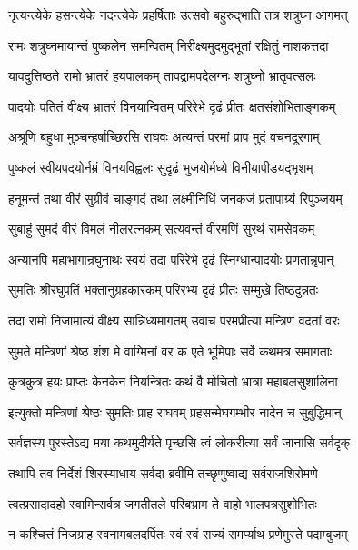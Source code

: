 \twolineshloka
{नृत्यन्त्येके हसन्त्येके नदन्त्येके प्रहर्षिताः}
{उत्सवो बहुरुद्भाति तत्र शत्रुघ्न आगमत्}%

\twolineshloka
{रामः शत्रुघ्नमायान्तं पुष्कलेन समन्वितम्}
{निरीक्ष्यमुदमुद्भूतां रक्षितुं नाशकत्तदा}%

\twolineshloka
{यावदुत्तिष्ठते रामो भ्रातरं हयपालकम्}
{तावद्रामपदेलग्नः शत्रुघ्नो भ्रातृवत्सलः}%

\twolineshloka
{पादयोः पतितं वीक्ष्य भ्रातरं विनयान्वितम्}
{परिरेभे दृढं प्रीतः क्षतसंशोभिताङ्गकम्}%

\twolineshloka
{अश्रूणि बहुधा मुञ्चन्हर्षाच्छिरसि राघवः}
{अत्यन्तं परमां प्राप मुदं वचनदूरगाम्}%

\twolineshloka
{पुष्कलं स्वीयपदयोर्नम्रं विनयविह्वलः}
{सुदृढं भुजयोर्मध्ये विनीयापीडयद्भृशम्}%

\twolineshloka
{हनूमन्तं तथा वीरं सुग्रीवं चाङ्गदं तथा}
{लक्ष्मीनिधिं जनकजं प्रतापाग्र्यं रिपुञ्जयम्}%

\twolineshloka
{सुबाहुं सुमदं वीरं विमलं नीलरत्नकम्}
{सत्यवन्तं वीरमणिं सुरथं रामसेवकम्}%

\twolineshloka
{अन्यानपि महाभागान्रघुनाथः स्वयं तदा}
{परिरेभे दृढं स्निग्धान्पादयोः प्रणतान्नृपान्}%

\twolineshloka
{सुमतिः श्रीरघुपतिं भक्तानुग्रहकारकम्}
{परिरभ्य दृढं प्रीतः सम्मुखे तिष्ठदुन्नतः}%

\twolineshloka
{तदा रामो निजामात्यं वीक्ष्य सान्निध्यमागतम्}
{उवाच परमप्रीत्या मन्त्रिणं वदतां वरः}%

\twolineshloka
{सुमते मन्त्रिणां श्रेष्ठ शंश मे वाग्मिनां वर}
{क एते भूमिपाः सर्वे कथमत्र समागताः}%

\twolineshloka
{कुत्रकुत्र हयः प्राप्तः केनकेन नियन्त्रितः}
{कथं वै मोचितो भ्रात्रा महाबलसुशालिना}%


\twolineshloka
{इत्युक्तो मन्त्रिणां श्रेष्ठः सुमतिः प्राह राघवम्}
{प्रहसन्मेघगम्भीर नादेन च सुबुद्धिमान्}%


\twolineshloka
{सर्वज्ञस्य पुरस्तेऽद्य मया कथमुदीर्यते}
{पृच्छसि त्वं लोकरीत्या सर्वं जानासि सर्वदृक्}%

\twolineshloka
{तथापि तव निर्देशं शिरस्याधाय सर्वदा}
{ब्रवीमि तच्छृणुष्वाद्य सर्वराजशिरोमणे}%

\twolineshloka
{त्वत्प्रसादादहो स्वामिन्सर्वत्र जगतीतले}
{परिबभ्राम ते वाहो भालपत्रसुशोभितः}%

\twolineshloka
{न कश्चित्तं निजग्राह स्वनामबलदर्पितः}
{स्वं स्वं राज्यं समर्प्याथ प्रणेमुस्ते पदाम्बुजम्}%

